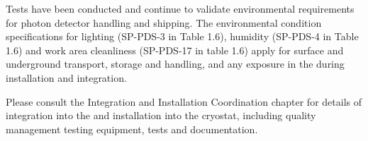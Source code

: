 Tests have been conducted and continue to validate environmental requirements for photon detector handling and shipping. The environmental condition specifications for lighting (SP-PDS-3 in Table 1.6), humidity (SP-PDS-4 in Table 1.6) and work area cleanliness (SP-PDS-17 in table 1.6)
apply for surface and underground transport, storage and handling, and any exposure in the  during installation and integration. 




Please consult the Integration and Installation Coordination chapter for details of  integration into the  and installation into the cryostat, including quality management testing equipment, tests and documentation. 


    
